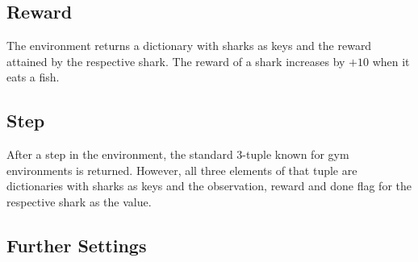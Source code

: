 \documentclass[12pt, letterpaper, fleqn, notitlepage]{article}
\begin{document}
\subsection{Reward}

The environment returns a dictionary with sharks as keys and the reward
attained by the respective shark. The reward of a shark increases by $+10$ when
it eats a fish.

\subsection{Step}

After a step in the environment, the standard 3-tuple known for gym
environments is returned. However, all three elements of that tuple are
dictionaries with sharks as keys and the observation, reward and done flag for
the respective shark as the value.

\subsection{Further Settings}




\end{document}
